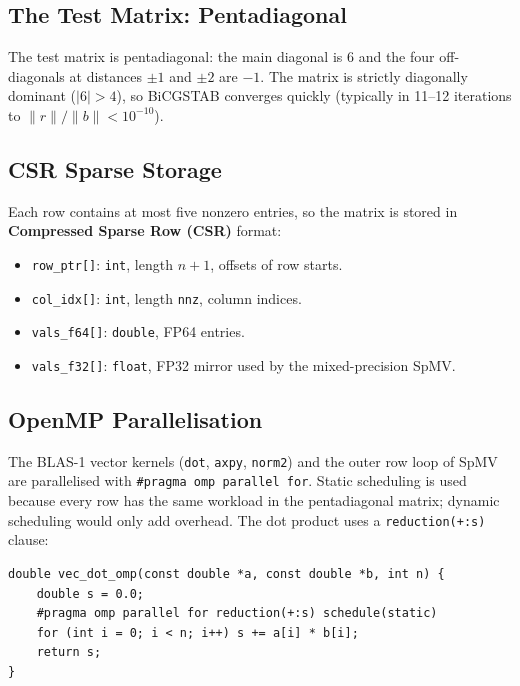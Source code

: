 \documentclass[11pt,a4paper]{article}
\begin{document}
\subsection{The Test Matrix: Pentadiagonal}

The test matrix is pentadiagonal: the main diagonal is $6$ and the
four off-diagonals at distances $\pm 1$ and $\pm 2$ are $-1$. The
matrix is strictly diagonally dominant ($|6| > 4$), so BiCGSTAB
converges quickly (typically in 11--12 iterations to
$\|r\|/\|b\| < 10^{-10}$).

\subsection{CSR Sparse Storage}

Each row contains at most five nonzero entries, so the matrix is
stored in \textbf{Compressed Sparse Row (CSR)} format:
\begin{itemize}
    \item \texttt{row\_ptr[]}: \texttt{int}, length $n+1$, offsets of
          row starts.
    \item \texttt{col\_idx[]}: \texttt{int}, length \texttt{nnz},
          column indices.
    \item \texttt{vals\_f64[]}: \texttt{double}, FP64 entries.
    \item \texttt{vals\_f32[]}: \texttt{float}, FP32 mirror used by
          the mixed-precision SpMV.
\end{itemize}

\subsection{OpenMP Parallelisation}

The BLAS-1 vector kernels (\texttt{dot}, \texttt{axpy},
\texttt{norm2}) and the outer row loop of SpMV are parallelised with
\texttt{\#pragma omp parallel for}. Static scheduling is used because
every row has the same workload in the pentadiagonal matrix; dynamic
scheduling would only add overhead. The dot product uses a
\texttt{reduction(+:s)} clause:

\begin{lstlisting}[caption={OpenMP dot-product kernel.}]
double vec_dot_omp(const double *a, const double *b, int n) {
    double s = 0.0;
    #pragma omp parallel for reduction(+:s) schedule(static)
    for (int i = 0; i < n; i++) s += a[i] * b[i];
    return s;
}
\end{lstlisting}
\end{document}
